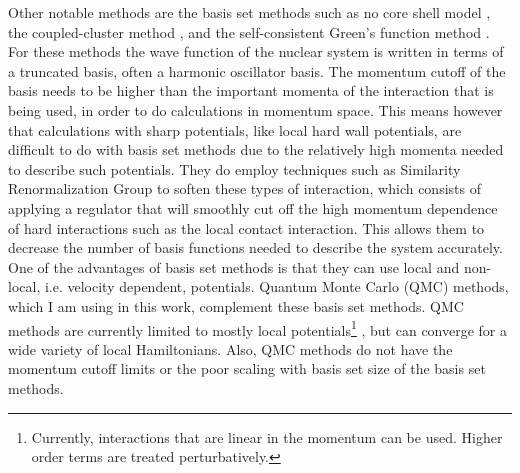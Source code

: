 Other notable methods are the basis set methods such as no core shell model \cite{navratil2009,barrett2013}, the coupled-cluster method \cite{hagen2014}, and the self-consistent Green's function method \cite{dickhoff2004,soma2014}. For these methods the wave function of the nuclear system is written in terms of a truncated basis, often a harmonic oscillator basis. The momentum cutoff of the basis needs to be higher than the important momenta of the interaction that is being used, in order to do calculations in momentum space. This means however that calculations with sharp potentials, like local hard wall potentials, are difficult to do with basis set methods due to the relatively high momenta needed to describe such potentials. They do employ techniques such as Similarity Renormalization Group \cite{hergert2016} to soften these types of interaction, which consists of applying a regulator that will smoothly cut off the high momentum dependence of hard interactions such as the local contact interaction. This allows them to decrease the number of basis functions needed to describe the system accurately. One of the advantages of basis set methods is that they can use local and non-local, i.e. velocity dependent, potentials. Quantum Monte Carlo (QMC) methods, which I am using in this work, complement these basis set methods. QMC methods are currently limited to mostly local potentials\footnote{Currently, interactions that are linear in the momentum can be used. Higher order terms are treated perturbatively.} \cite{lynn2012}, but can converge for a wide variety of local Hamiltonians. Also, QMC methods do not have the momentum cutoff limits or the poor scaling with basis set size of the basis set methods.

